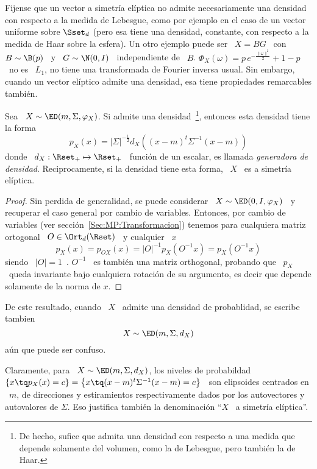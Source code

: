 Fijense  que un  vector a  simetr\'ia  el\'iptica no  admite necesariamente  una
densidad con respecto a la medida de Lebesgue, como por ejemplo en el caso de un
vector uniforme  sobre $\Sset_d$  (pero esa tiene  una densidad,  constante, con
respecto a la medida de Haar sobre la  esfera). Un otro ejemplo puede ser \ $X =
B  G$ \  con \  $B \sim  \B(p)$ \  y \  $G \sim  \N(0,I)$ \  independiente  de \
$B$. $\Phi_X(\omega)  = p \, e^{-\frac{\|  \omega \|^2}{2}} + 1  - p$ \  no es \
$L_1$, \ie  no tiene  una transformada de  Fourier inversa usual.   Sin embargo,
cuando  un  vector  el\'iptico   admite  una  densidad,  esa  tiene  propiedades
remarcables tambi\'en.
%
\begin{teorema}
%
  Sea \  $X \sim  \ED(m,\Sigma,\varphi_X)$. Si admite  una densidad~\footnote{De
    hecho, sufice que admita una densidad  con respecto a una medida que depende
    solamente  del volumen,  como  la  de Lebesgue,  pero  tambi\'en la de  Haar.},
  entonces esta densidad tiene la forma
  \[
  p_X(x)  = |\Sigma|^{-\frac12} d_X\left( (x-m)^t \Sigma^{-1} (x-m) \right)
  \]
  donde \ $d_X:  \Rset_+ \mapsto \Rset_+$ \ funci\'on de  un escalar, es llamada
  {\em generadora de densidad}. Reciprocamente, si la densidad tiene esta forma,
  \ $X$ \ es a simetr\'ia el\'iptica.
\end{teorema}
%
\begin{proof}
  Sin perdida de generalidad, se  puede considerar \ $X \sim \ED(0,I,\varphi_X)$
  \ y recuperar  el caso general por cambio de  variables.  Entonces, por cambio
  de   variables   (ver   secci\'on~\ref{Sec:MP:Transformacion})  tenemos   para
  cualquiera matriz ortogonal \ $O \in \Ort_d(\Rset)$ \ y cualquier \ $x$
  \[
  p_X(x)  = p_{O  X}(x)  =  |O|^{-1} p_X\left(  O^{-1}  x \right)  =
  p_X\left( O^{-1} x \right)
  \]
  siendo \ $|O| = 1$~\cite{Bha97,  HorJoh13}. $O^{-1}$ \ es tambi\'en una matriz
  orthogonal, probando que \ $p_X$ \ queda invariante bajo cualquiera rotaci\'on
  de su argumento, es decir que depende solamente de la norma de $x$.
\end{proof}

De este resultado, cuando \ $X$ \ admite una densidad de probablidad, se escribe
tambien
%
\[
X \sim \ED(m,\Sigma,d_X)
\]
%
a\'un que puede ser confuso.

Claramente, para \ $X \sim  \ED(m,\Sigma,d_X)$, los niveles de probabildad \ $\{
x \tq p_X(x)  = c \} = \left\{  x \tq (x-m)^t \Sigma^{-1} (x-m) =  c \right\}$ \
son   elipsoides  centrados   en   \  $m$,   de   direcciones  y   estiramientos
respectivamente  dados por  los  autovectores y  autovalores  de $\Sigma$.   Eso
justifica tambi\'en la denominaci\'on ``$X$ \ a simetr\'ia el\'iptica''.

